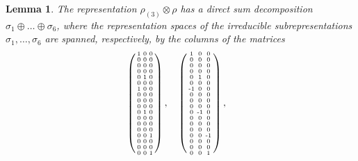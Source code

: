 \documentclass[11pt,reqno]{amsart}
\newtheorem{lemma}[theorem]{Lemma}
\renewcommand{\=}{\;=\;}
\theoremstyle{myremark}
\begin{document}
\begin{lemma}\label{lem: Rep}
The representation $\rho_{(3)}\!\otimes\rho$ has a direct sum decomposition $\sigma_1\oplus\ldots\oplus\sigma_6$, where the representation spaces of the irreducible subrepresentations $\sigma_1,\!\ldots,\!\sigma_6$ are spanned, respectively, by the columns of the matrices
\begin{align*}
&
\small
\left( \begin{smallmatrix}
1 & 0 & 0 
\\
 0 & 0 & 0 
\\
 0 & 0 & 0 
\\
 0 & 0 & 0 
\\
 0 & 1 & 0 
\\
 0 & 0 & 0 
\\
 1 & 0 & 0 
\\
 0 & 0 & 0 
\\
 0 & 0 & 0 
\\
 0 & 0 & 0 
\\
 0 & 1 & 0 
\\
 0 & 0 & 0 
\\
 0 & 0 & 0 
\\
 0 & 0 & 0 
\\
 0 & 0 & 1 
\\
 0 & 0 & 0 
\\
 0 & 0 & 0 
\\
 0 & 0 & 1 
\end{smallmatrix} \right),
&&
\small
\left( \begin{smallmatrix}
1 & 0 & 0 
\\
 0 & 0 & 0 
\\
 0 & 0 & 0 
\\
 0 & 0 & 0 
\\
 0 & 1 & 0 
\\
 0 & 0 & 0 
\\
 \text{-}1 & 0 & 0 
\\
 0 & 0 & 0 
\\
 0 & 0 & 0 
\\
 0 & 0 & 0 
\\
 0 & \text{-}1 & 0 
\\
 0 & 0 & 0 
\\
 0 & 0 & 0 
\\
 0 & 0 & 0 
\\
 0 & 0 & \text{-}1 
\\
 0 & 0 & 0 
\\
 0 & 0 & 0 
\\
 0 & 0 & 1
\end{smallmatrix} \right),

\end{align*}
\end{lemma}
\end{document}
